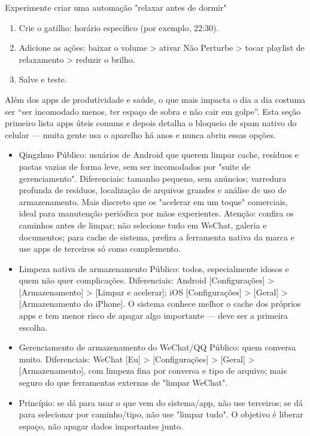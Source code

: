 \begin{tcbpractice}{Experimente criar uma automação "relaxar antes de dormir"}
\begin{enumerate}
  \item Crie o gatilho: horário específico (por exemplo, 22:30).
  \item Adicione as ações: baixar o volume > ativar Não Perturbe > tocar playlist de relaxamento > reduzir o brilho.
  \item Salve e teste.
\end{enumerate}

\end{tcbpractice}


Além dos apps de produtividade e saúde, o que mais impacta o dia a dia costuma ser “ser incomodado menos, ter espaço de sobra e não cair em golpe”. Esta seção primeiro lista apps úteis comuns e depois detalha o bloqueio de spam nativo do celular — muita gente usa o aparelho há anos e nunca abriu essas opções.


\begin{itemize}
  \item Qingzhuo Público: usuários de Android que querem limpar cache, resíduos e pastas vazias de forma leve, sem ser incomodados por "suite de gerenciamento". Diferenciais: tamanho pequeno, sem anúncios; varredura profunda de resíduos, localização de arquivos grandes e análise de uso de armazenamento. Mais discreto que os "acelerar em um toque" comerciais, ideal para manutenção periódica por mãos experientes. Atenção: confira os caminhos antes de limpar; não selecione tudo em WeChat, galeria e documentos; para cache de sistema, prefira a ferramenta nativa da marca e use apps de terceiros só como complemento.
  \item Limpeza nativa de armazenamento Público: todos, especialmente idosos e quem não quer complicações. Diferenciais: Android [Configurações] > [Armazenamento] > [Limpar e acelerar]; iOS [Configurações] > [Geral] > [Armazenamento do iPhone]. O sistema conhece melhor o cache dos próprios apps e tem menor risco de apagar algo importante — deve ser a primeira escolha.
  \item Gerenciamento de armazenamento do WeChat/QQ Público: quem conversa muito. Diferenciais: WeChat [Eu] > [Configurações] > [Geral] > [Armazenamento], com limpeza fina por conversa e tipo de arquivo; mais seguro do que ferramentas externas de "limpar WeChat".
  \item Princípio: se dá para usar o que vem do sistema/app, não use terceiros; se dá para selecionar por caminho/tipo, não use "limpar tudo". O objetivo é liberar espaço, não apagar dados importantes junto.
\end{itemize}

